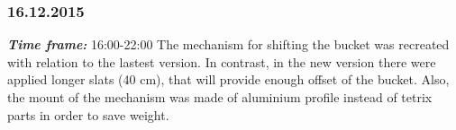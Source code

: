 \subsubsection{16.12.2015}
\textit{\textbf{Time frame:}} 16:00-22:00 \newline
The mechanism for shifting the bucket was recreated with relation to the lastest version. In contrast, in the new version there were applied longer slats (40 cm), that will provide enough offset of the bucket. Also, the mount of the mechanism was made of aluminium profile instead of tetrix parts in order to save weight.

\begin{figure}[H]
	\begin{minipage}[h]{0.58\linewidth}

\end{minipage}
\end{figure}
